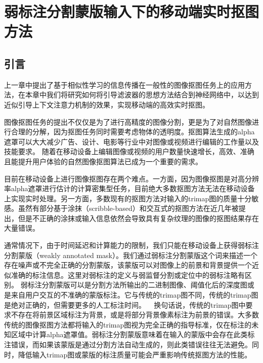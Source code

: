 \chapter{弱标注分割蒙版输入下的移动端实时抠图方法}
\section{引言}
上一章中提出了基于相似性学习的信息传播在一般性的图像抠图任务上的应用方法，在本章中我们将研究如何将引导滤波器的思想方法结合到神经网络中，以达到近似引导上下文注意力机制的效果，实现移动端的高效实时抠图。

图像抠图任务的提出不仅仅是为了进行高精度的图像分割，更是为了对自然图像进行合理的分解，因为抠图任务同时需要考虑物体的透明度。抠图算法生成的alpha遮罩可以大大减少广告、设计、电影等行业中对图像或视频进行编辑的工作量以及技能要求。
随着在移动设备上编辑图像或视频的用户数量快速增长，高效、准确且能提升用户体验的自然图像抠图算法已成为一个重要的需求。

目前在移动设备上进行图像抠图存在两个难点。一方面，因为图像抠图是对高分辨率alpha遮罩进行估计的计算密集型任务，目前绝大多数抠图方法\cite{levin2008closed,chen2013knn,cho2016natural,xu2017deep}无法在移动设备上实现实时处理。另一方面，多数现有的抠图方法对输入的trimap图的质量十分敏感。虽然有部分基于涂抹（scribble-based）\cite{lee2011nonlocal}和交互式\cite{yang2018active}的抠图方法在近几年被提出，但是不正确的涂抹或输入信息依然会导致具有复杂纹理的图像的抠图结果存在大量错误。

通常情况下，由于时间延迟和计算能力的限制，我们只能在移动设备上获得弱标注分割蒙版（weakly annotated mask）。我们通过弱标注分割蒙版这个词来描述一个存在噪声或不完全正确的分割蒙版，该蒙版可以对图像上的前景和背景提供一个近似准确的标注信息。这里对弱标注的定义与弱监督分割\cite{papandreou2015weakly}或定位\cite{oquab2015object}中的弱标注略有区别。
弱标注分割蒙版可以是分割方法所输出的二进制图像、阈值化后的深度图或是来自用户交互的不准确的蒙版标注。它与传统的trimap图不同，传统的trimap图是绝对正确的，但需要更多的人工标注时间。
  换句话说，传统的trimap图中要求不存在将前景区域标注为背景，或是将部分背景像素标注为前景的错误。大多数传统的图像抠图方法都将输入的trimap图视为完全正确的指导标准，仅在标注的未知区域中计算alpha遮罩值。弱标注分割蒙版意味着在输入的蒙版中会存在此类标注错误，而如果该蒙版是通过分割方法自动生成的，则此类错误往往无法避免。同时，降低输入trimap图或蒙版的标注质量可能会严重影响传统抠图方法的性能。

